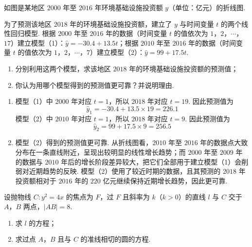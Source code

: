 \begin{problem}
如图是某地区 \(2000\) 年至 \(2016\) 年环境基础设施投资额 \(y\)（单位：亿元）的折线图.

为了预测该地区 \(2018\) 年的环境基础设施投资额，建立了 \(y\) 与时间变量 \(t\) 的两个线性回归模型. 根据 \(2000\) 年至 \(2016\) 年的数据（时间变量 \(t\) 的值依次为 \(1\)，\(2\)，\(\cdots\)，\(17\)）建立模型（1）：\(\hat y=-30.4+13.5t\)；根据 \(2010\) 年至 \(2016\) 年的数据（时间变量 \(t\) 的值依次为 \(1\)，\(2\)，\(\cdots\)，\(7\)）建立模型（2）：\(\hat y=99+17.5t\).

\begin{enumerate}
\item 分别利用这两个模型，求该地区 \(2018\) 年的环境基础设施投资额的预测值；
\item 你认为用哪个模型得到的预测值更可靠？并说明理由.
\end{enumerate}

{\begingroup
    \leftskip=0pt\relax
\endgroup}
\end{problem}

\begin{solution}
\begin{enumerate}
\item 模型（1）中 \(2000\) 年对应 \(t=1\)，所以 \(2018\) 年对应 \(t=19\). 因此预测值为
\[
\hat y_1=-30.4+13.5\times19=226.1
\]
模型（2）中 \(2010\) 年对应 \(t=1\)，所以 \(2018\) 年对应 \(t=9\). 因此预测值为
\[
\hat y_2=99+17.5\times9=256.5
\]
\item 模型（2）得到的预测值更可靠. 从折线图看，\(2010\) 年至 \(2016\) 年的数据点大致分布在一条直线附近，呈现出较明显的线性增长趋势；而 \(2000\) 年至 \(2009\) 年的数据与 \(2010\) 年后的增长阶段差异较大，把它们全部用于建立模型（1）会削弱对近期趋势的反映. 模型（2）使用了较近时期的数据，且其预测的 \(2018\) 年投资额相对于 \(2016\) 年的 \(220\) 亿元继续保持近期增长趋势，因此更可靠.
\end{enumerate}
\end{solution}

\begin{problem}
设抛物线 \(C:y^2=4x\) 的焦点为 \(F\)，过 \(F\) 且斜率为 \(k\)（\(k>0\)）的直线 \(l\) 与 \(C\) 交于 \(A\)，\(B\) 两点，\(|AB|=8\).

\begin{enumerate}
\item 求 \(l\) 的方程；
\item 求过点 \(A\)，\(B\) 且与 \(C\) 的准线相切的圆的方程.
\end{enumerate}
\end{problem}

